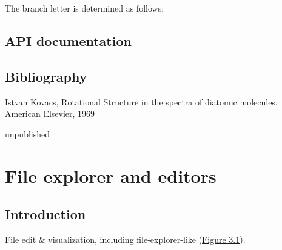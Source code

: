 \documentclass[letterpaper,10pt,english]{sphinxmanual}
\begin{document}
The branch letter is determined as follows:

\begin{sphinxVerbatim}[commandchars=\\\{\}]
     
    
     
\end{sphinxVerbatim}


\section{API documentation}
\label{\detokenize{convmol:api-documentation}}


\section{Bibliography}
\label{\detokenize{convmol:bibliography}}
\sphinxstylestrong{{[}Kovacs1969{]}} Istvan Kovacs, Rotational Structure in the spectra of diatomic molecules. American Elsevier, 1969

\sphinxstylestrong{{[}Sing1998{]}} unpublished

\sphinxstylestrong{{[}NISTRef{]}} 

\sphinxstylestrong{{[}Kurucz{]}} 


\chapter{File explorer and editors}
\label{\detokenize{explorer::doc}}\label{\detokenize{explorer:file-explorer-and-editors}}

\section{Introduction}
\label{\detokenize{explorer:introduction}}
File edit \& visualization, including file-explorer-like  (\hyperref[\detokenize{explorer:figexplorer}]{Figure \ref{\detokenize{explorer:figexplorer}}}).
\label{\detokenize{explorer:figexplorer}}
\begin{figure}[htbp]
\centering

\noindent{}
\label{\detokenize{explorer:figexplorer}}\end{figure}
\end{document}
